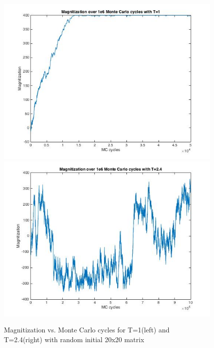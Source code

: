 \documentclass[10pt,a4paper]{article}
\begin{document}
\begin{figure}[H]
\centerline{
\includegraphics[scale=0.4]{magn20_1e6mc}
\includegraphics[scale=0.4]{magn20_1e6mc_T24}
}
\caption{Magnitization vs. Monte Carlo cycles for T=1(left) and T=2.4(right) with random initial 20x20 matrix}
\label{fig:magn_20_1e6}
\end{figure}
\end{document}
